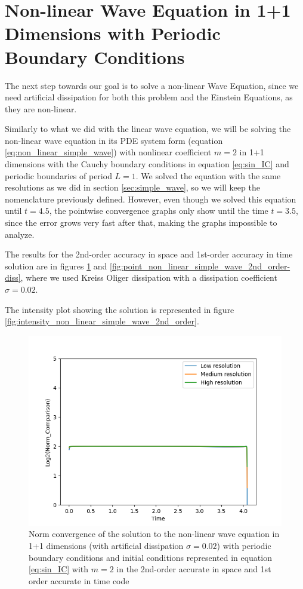 \section{Non-linear Wave Equation in 1+1 Dimensions with Periodic Boundary Conditions}
\label{sec:non_linear_wave}

The next step towards our goal is to solve a non-linear Wave Equation, since we need artificial dissipation for both this problem and the Einstein Equations, as they are non-linear.

Similarly to what we did with the linear wave equation, we will be solving the non-linear wave equation in its PDE system form (equation \eqref{eq:non_linear_simple_wave}) with nonlinear coefficient $m=2$ in 1+1 dimensions with the Cauchy boundary conditions in equation \eqref{eq:sin_IC} and periodic boundaries of period $L = 1$. We solved the equation with the same resolutions as we did in section \ref{sec:simple_wave}, so we will keep the nomenclature previously defined. However, even though we solved this equation until $t = 4.5$, the pointwise convergence graphs only show until the time $t = 3.5$, since the error grows very fast after that, making the graphs impossible to analyze.
 

The results for the 2nd-order accuracy in space and 1st-order accuracy in time solution are in figures \ref{fig:norm_non_linear_simple_wave_2nd_order-diss} and \ref{fig:point_non_linear_simple_wave_2nd_order-diss}, where we used Kreiss Oliger dissipation with a dissipation coefficient $\sigma = 0.02$.

The intensity plot showing the solution is represented in figure \ref{fig:intensity_non_linear_simple_wave_2nd_order}.

\begin{figure}[t!]
    \centering
    \includegraphics[width=\columnwidth]{Images/non_linear_simple_wave-2nd-norm-diss.png}
    \caption{Norm convergence of the solution to the non-linear wave equation in 1+1 dimensions (with artificial dissipation $\sigma = 0.02$) with periodic boundary conditions and initial conditions represented in equation \eqref{eq:sin_IC} with $m = 2$ in the 2nd-order accurate in space and 1st order accurate in time code}
    \label{fig:norm_non_linear_simple_wave_2nd_order-diss}
\end{figure}

